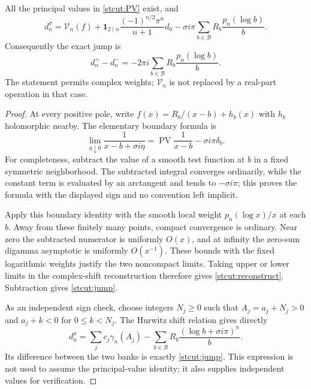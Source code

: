 \begin{theorem}
\label{stcut:reconstruction}
All the principal values in \eqref{stcut:PV} exist, and
\begin{equation}\label{stcut:reconstruct}
 \boxed{d_n^\sigma=\mathcal V_n(f)
 +\mathbf1_{2\mid n}\frac{(-1)^{n/2}\pi^n}{n+1}d_0
 -\sigma i\pi\sum_{b\in\mathcal B}
                  R_b\frac{p_n(\log b)}b.}
\end{equation}
Consequently the exact jump is
\begin{equation}\label{stcut:jump}
 d_n^+-d_n^-=-2\pi i\sum_{b\in\mathcal B}R_b\frac{p_n(\log b)}b.
\end{equation}
The statement permits complex weights; $\mathcal V_n$ is not replaced
by a real-part operation in that case.
\end{theorem}
\begin{proof}
At every positive pole, write
$f(x)=R_b/(x-b)+h_b(x)$ with $h_b$ holomorphic nearby.
The elementary boundary formula is
\[
 \lim_{\eta\downarrow0}\frac1{x-b+\sigma i\eta}
  =\operatorname{PV}\frac1{x-b}-\sigma i\pi\delta_b.
\]
For completeness, subtract the value of a smooth test function at
$b$ in a fixed symmetric neighborhood. The subtracted integral
converges ordinarily, while the constant term is evaluated by an
arctangent and tends to $-\sigma i\pi$; this proves the formula
with the displayed sign and no convention left implicit.

Apply this boundary identity with the smooth local weight
$p_n(\log x)/x$ at each $b$. Away from these finitely many points,
compact convergence is ordinary. Near zero the subtracted numerator
is uniformly $O(x)$, and at infinity the zero-sum digamma asymptotic
is uniformly $O(x^{-1})$. These bounds with the fixed logarithmic
weights justify the two noncompact limits. Taking upper or lower
limits in the complex-shift reconstruction therefore gives
\eqref{stcut:reconstruct}. Subtraction gives \eqref{stcut:jump}.

As an independent sign check, choose integers $N_j\ge0$ such that
$A_j=a_j+N_j>0$ and $a_j+k<0$ for $0\le k<N_j$. The Hurwitz shift
relation gives directly
\[
 d_n^\sigma=\sum_jc_j\gamma_n(A_j)
 -\sum_{b\in\mathcal B}R_b\frac{(\log b+\sigma i\pi)^n}{b}.
\]
Its difference between the two banks is exactly \eqref{stcut:jump}.
This expression is not used to assume the principal-value identity;
it also supplies independent values for verification.
\end{proof}

